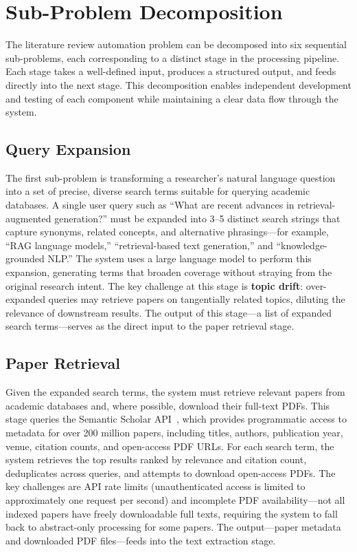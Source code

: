 \documentclass[12pt,a4paper]{article}
\begin{document}
\section{Sub-Problem Decomposition}

The literature review automation problem can be decomposed into six sequential sub-problems, each corresponding to a distinct stage in the processing pipeline. Each stage takes a well-defined input, produces a structured output, and feeds directly into the next stage. This decomposition enables independent development and testing of each component while maintaining a clear data flow through the system.

\subsection{Query Expansion}

The first sub-problem is transforming a researcher's natural language question into a set of precise, diverse search terms suitable for querying academic databases. A single user query such as ``What are recent advances in retrieval-augmented generation?'' must be expanded into 3--5 distinct search strings that capture synonyms, related concepts, and alternative phrasings---for example, ``RAG language models,'' ``retrieval-based text generation,'' and ``knowledge-grounded NLP.'' The system uses a large language model to perform this expansion, generating terms that broaden coverage without straying from the original research intent. The key challenge at this stage is \textbf{topic drift}: over-expanded queries may retrieve papers on tangentially related topics, diluting the relevance of downstream results. The output of this stage---a list of expanded search terms---serves as the direct input to the paper retrieval stage.

\subsection{Paper Retrieval}

Given the expanded search terms, the system must retrieve relevant papers from academic databases and, where possible, download their full-text PDFs. This stage queries the Semantic Scholar API~\citep{ammar2018semanticscholar}, which provides programmatic access to metadata for over 200 million papers, including titles, authors, publication year, venue, citation counts, and open-access PDF URLs. For each search term, the system retrieves the top results ranked by relevance and citation count, deduplicates across queries, and attempts to download open-access PDFs. The key challenges are API rate limits (unauthenticated access is limited to approximately one request per second) and incomplete PDF availability---not all indexed papers have freely downloadable full texts, requiring the system to fall back to abstract-only processing for some papers. The output---paper metadata and downloaded PDF files---feeds into the text extraction stage.
\end{document}
